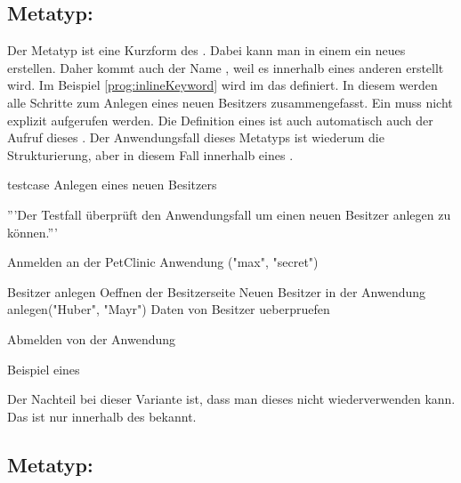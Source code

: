 \subsection{Metatyp: }

Der Metatyp  ist eine Kurzform des . Dabei kann man in einem  ein neues  erstellen. Daher kommt auch der Name , weil es innerhalb eines anderen  erstellt wird. Im Beispiel \ref{prog:inlineKeyword} wird im   das   definiert. In diesem  werden alle Schritte zum Anlegen eines neuen Besitzers zusammengefasst. Ein  muss nicht explizit aufgerufen werden. Die Definition eines  ist auch automatisch auch der Aufruf dieses . Der Anwendungsfall dieses Metatyps ist wiederum die Strukturierung, aber in diesem Fall innerhalb eines . 

\begin{program}
\begin{JavaCode}
testcase Anlegen eines neuen Besitzers {
	'''Der Testfall überprüft den Anwendungsfall um einen 
	   neuen Besitzer anlegen zu können.'''
	
	Anmelden an der PetClinic Anwendung ("max", "secret")
	
	Besitzer anlegen {
		Oeffnen der Besitzerseite		
		Neuen Besitzer in der Anwendung anlegen("Huber", "Mayr")
		Daten von Besitzer ueberpruefen
	}
	
	Abmelden von der Anwendung
}
\end{JavaCode}
\caption{Beispiel eines }
\label{prog:inlineKeyword}
\end{program}

\SuperPar
Der Nachteil bei dieser Variante ist, dass man dieses  nicht wiederverwenden kann. Das  ist nur innerhalb des  bekannt.


\subsection{Metatyp: }

